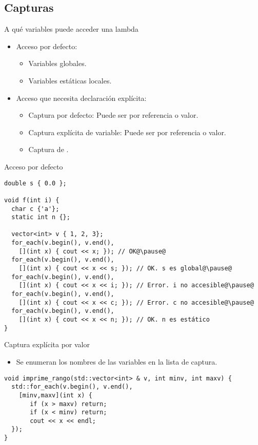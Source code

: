 \subsection{Capturas}

\begin{frame}[t]{A qué variables puede acceder una lambda}
  \begin{itemize}
    \item Acceso por defecto:
      \begin{itemize}
        \item Variables globales.
        \item Variables estáticas locales.
      \end{itemize}
    \item Acceso que necesita declaración explícita:
      \begin{itemize}
        \item Captura por defecto: Puede ser por referencia o valor.
        \item Captura explícita de variable: Puede ser por referencia o valor.
        \item Captura de .
      \end{itemize}
  \end{itemize}
\end{frame}

\begin{frame}[t,fragile]{Acceso por defecto}
\begin{lstlisting}[escapechar=@]
double s { 0.0 };

void f(int i) {
  char c {'a'};
  static int n {};

  vector<int> v { 1, 2, 3};
  for_each(v.begin(), v.end(),
    [](int x) { cout << x; }); // OK@\pause@
  for_each(v.begin(), v.end(),
    [](int x) { cout << x << s; }); // OK. s es global@\pause@
  for_each(v.begin(), v.end(),
    [](int x) { cout << x << i; }); // Error. i no accesible@\pause@
  for_each(v.begin(), v.end(),
    [](int x) { cout << x << c; }); // Error. c no accesible@\pause@
  for_each(v.begin(), v.end(),
    [](int x) { cout << x << n; }); // OK. n es estático
}
\end{lstlisting}
\end{frame}

\begin{frame}[t,fragile]{Captura explícita por valor}
  \begin{itemize}
    \item Se enumeran los nombres de las variables en la lista de captura.
  \end{itemize}
\pause
\begin{lstlisting}[escapechar=@]
void imprime_rango(std::vector<int> & v, int minv, int maxv) {
  std::for_each(v.begin(), v.end(),
    [minv,maxv](int x) { 
       if (x > maxv) return;
       if (x < minv) return;
       cout << x << endl;
  });
}
\end{lstlisting}
\end{frame}

